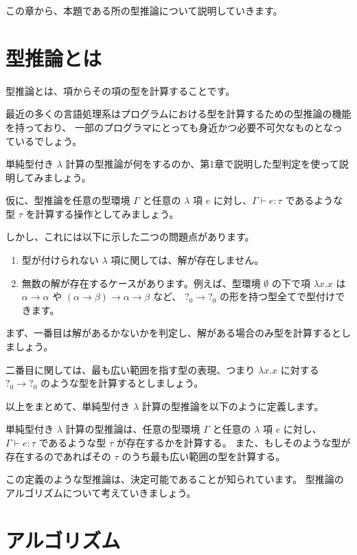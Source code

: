 
この章から、本題である所の型推論について説明していきます。

\section{型推論とは}

型推論とは、項からその項の型を計算することです。

最近の多くの言語処理系はプログラムにおける型を計算するための型推論の機能を持っており、
一部のプログラマにとっても身近かつ必要不可欠なものとなっているでしょう。

単純型付き $\lambda$ 計算の型推論が何をするのか、第1章で説明した型判定を使って説明してみましょう。

仮に、型推論を任意の型環境 $\Gamma$ と任意の $\lambda$ 項 $e$ に対し、$\Gamma \vdash e : \tau$
であるような型 $\tau$ を計算する操作としてみましょう。

しかし、これには以下に示した二つの問題点があります。

\begin{enumerate}
  \item 型が付けられない $\lambda$ 項に関しては、解が存在しません。
  \item 無数の解が存在するケースがあります。例えば、型環境 $\emptyset$ の下で項 $\lambda x . x$ は
        $\alpha \to \alpha$ や $(\alpha \to \beta) \to \alpha \to \beta$ など、
        $?_0 \to ?_0$ の形を持つ型全てで型付けできます。
\end{enumerate}

まず、一番目は解があるかないかを判定し、解がある場合のみ型を計算するとしましょう。

二番目に関しては、最も広い範囲を指す型の表現、つまり $\lambda x . x$ に対する $?_0 \to ?_0$
のような型を計算するとしましょう。

以上をまとめて、単純型付き $\lambda$ 計算の型推論を以下のように定義します。

\begin{definition}
単純型付き $\lambda$ 計算の型推論は、任意の型環境 $\Gamma$ と任意の $\lambda$ 項 $e$ に対し、
$\Gamma \vdash e : \tau$ であるような型 $\tau$ が存在するかを計算する。
また、もしそのような型が存在するのであればその $\tau$ のうち最も広い範囲の型を計算する。
\end{definition}

この定義のような型推論は、決定可能であることが知られています。
型推論のアルゴリズムについて考えていきましょう。

\section{アルゴリズム}

